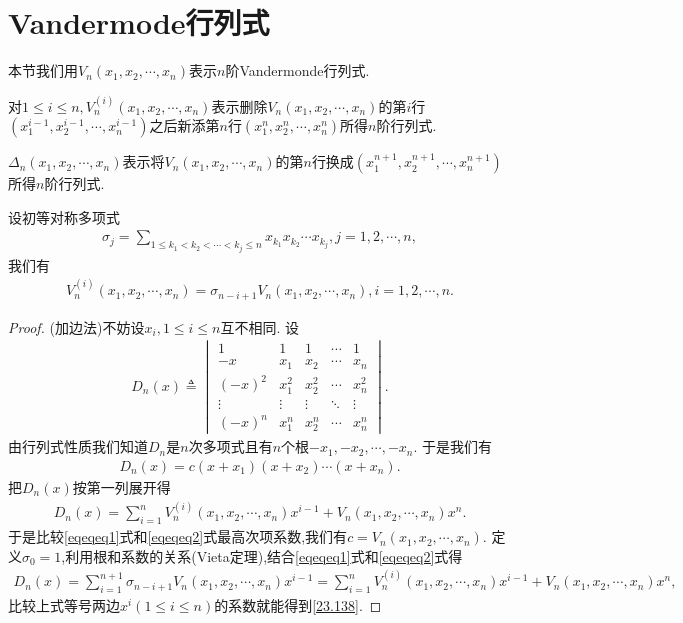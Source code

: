\documentclass[../../main.tex]{subfiles}%
\begin{document}
\section{Vandermode行列式}

本节我们用\(V_n(x_1,x_2,\cdots,x_n)\)表示\(n\)阶Vandermonde行列式.
\begin{definition}
对\(1\leqslant i\leqslant n,V_n^{(i)}(x_1,x_2,\cdots,x_n)\)表示删除\(V_n(x_1,x_2,\cdots,x_n)\)的第\(i\)行\((x_1^{i - 1},x_2^{i - 1},\cdots,x_n^{i - 1})\)之后新添第\(n\)行\((x_1^{n},x_2^{n},\cdots,x_n^{n})\)所得\(n\)阶行列式.
\end{definition}

\begin{definition}
\(\Delta_n(x_1,x_2,\cdots,x_n)\)表示将\(V_n(x_1,x_2,\cdots,x_n)\)的第\(n\)行换成\((x_1^{n + 1},x_2^{n + 1},\cdots,x_n^{n + 1})\)所得\(n\)阶行列式.
\end{definition}


\begin{example}
设初等对称多项式
\begin{align}\label{23.137}
\sigma_j=\sum_{1\leqslant k_1<k_2<\cdots<k_j\leqslant n}x_{k_1}x_{k_2}\cdots x_{k_j},j = 1,2,\cdots,n,
\end{align}
我们有
\begin{align}
V_n^{(i)}(x_1,x_2,\cdots,x_n)=\sigma_{n - i + 1}V_n(x_1,x_2,\cdots,x_n),i = 1,2,\cdots,n.\label{23.138}
\end{align}
\end{example}
\begin{proof}
(加边法)不妨设\(x_i,1\leqslant i\leqslant n\)互不相同. 设
\begin{align*}
D_n(x)\triangleq\begin{vmatrix}
1&1&1&\cdots&1\\
-x&x_1&x_2&\cdots&x_n\\
(-x)^2&x_1^2&x_2^2&\cdots&x_n^2\\
\vdots&\vdots&\vdots&\ddots&\vdots\\
(-x)^n&x_1^n&x_2^n&\cdots&x_n^n
\end{vmatrix}.
\end{align*}
由行列式性质我们知道\(D_n\)是\(n\)次多项式且有\(n\)个根\(-x_1,-x_2,\cdots,-x_n\). 于是我们有
\begin{align}\label{eqeqeq1}
D_n(x)=c(x + x_1)(x + x_2)\cdots(x + x_n).
\end{align}
把\(D_n(x)\)按第一列展开得
\begin{align}\label{eqeqeq2}
D_n(x)=\sum_{i = 1}^{n}V_n^{(i)}(x_1,x_2,\cdots,x_n)x^{i - 1}+V_n(x_1,x_2,\cdots,x_n)x^n.
\end{align}
于是比较\eqref{eqeqeq1}式和\eqref{eqeqeq2}式最高次项系数,我们有\(c = V_n(x_1,x_2,\cdots,x_n)\). 定义\(\sigma_0 = 1\),利用根和系数的关系(Vieta定理),结合\eqref{eqeqeq1}式和\eqref{eqeqeq2}式得
\begin{align*}
D_n(x)=\sum_{i = 1}^{n + 1}\sigma_{n - i + 1}V_n(x_1,x_2,\cdots,x_n)x^{i - 1}=\sum_{i = 1}^{n}V_n^{(i)}(x_1,x_2,\cdots,x_n)x^{i - 1}+V_n(x_1,x_2,\cdots,x_n)x^n,
\end{align*}
比较上式等号两边$x^i(1\leqslant  i\leqslant  n)$的系数就能得到\eqref{23.138}. 
\end{proof}
\end{document}
